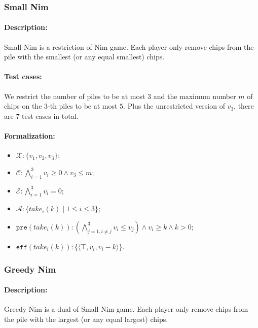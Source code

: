 \documentclass[review]{elsarticle}
\newcommand{\set}[1]{\{ #1 \}}
\newcommand{\tuple}[1]{\langle {#1} \rangle}
\newcommand{\true}{\top}
\newcommand{\statevar}{\mathcal{X}}
\newcommand{\act}{\mathcal{A}}
\newcommand{\constraint}{\mathcal{C}}
\newcommand{\estate}{\mathcal{E}}
\newcommand{\pre}{\mathtt{pre}}
\newcommand{\eff}{\mathtt{eff}}
\begin{document}
\subsubsection{Small Nim \protect\cite{BerCG2001}}

\paragraph{Description:} 
Small Nim is a restriction of Nim game.
Each player only remove chips from the pile with the smallest (or any equal smallest) chips.

\paragraph{Test cases:}
We restrict the number of piles to be at most $3$ and the maximum number $m$ of chips on the $3$-th piles to be at most $5$. 
Plus the unrestricted version of $v_3$, there are $7$ test cases in total.

\paragraph{Formalization:}

\begin{itemize}
	\item $\statevar: \set{v_1, v_2, v_3}$;
	\item $\constraint:\bigwedge_{i=1}^{3} v_i \ge 0 \wedge v_3 \le m$;
	\item $\estate: \bigwedge_{i=1}^{3} v_i = 0$;
	\item $\act:\set{take_i(k) {\mid}1\le i \le 3}$;
	\item $\pre(take_i(k)) : (\bigwedge_{j=1,i\neq j}^{3} v_i \le v_j) \wedge v_i \ge k \wedge  k > 0$;
	\item $\eff(take_i(k)) : \set{\tuple{\true, v_i, v_i-k}}$.
\end{itemize}



\subsubsection{Greedy Nim \protect\cite{AlbN2004}}

\paragraph{Description:}
Greedy Nim is a dual of Small Nim game.
Each player only remove chips from the pile with the largest (or any equal largest) chips.
\end{document}
